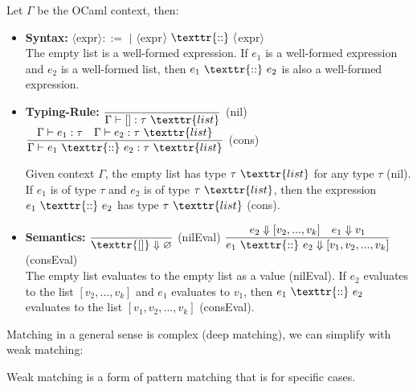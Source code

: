 \begin{Def}

    Let $\Gamma$ be the OCaml context, then:
    \begin{itemize}
        \item \textbf{Syntax:} \LARGE 
        $\langle$expr$\rangle::=$ \texttr{[]} $\mid$ $\langle$expr$\rangle\ \texttr{::}\ \langle$expr$\rangle$ \normalsize\\
        
        \vspace{-.5em}
        \noindent
        The empty list \texttr{[]} is a well-formed expression. If $e_1$ is a well-formed expression and $e_2$ is a well-formed list, then $e_1\ \texttr{::}\ e_2$ is also a well-formed expression.

        \item \textbf{Typing-Rule:} \large \quad 
            $\dfrac{}{\Gamma\vdash []:\tau\ \texttr{list}}$ (nil)
            \quad
             $\dfrac{\Gamma\vdash e_1:\tau \quad \Gamma\vdash e_2:\tau\ \texttr{list}}{\Gamma\vdash e_1\ \texttr{::}\ e_2:\tau\ \texttr{list}}$ (cons) 
      

        \normalsize
        \noindent
        Given context $\Gamma$, the empty list \texttr{[]} has type $\tau\ \texttr{list}$ for any type $\tau$ (nil).
        If $e_1$ is of type $\tau$ and $e_2$ is of type $\tau\ \texttr{list}$, then the expression $e_1\ \texttr{::}\ e_2$ has type $\tau\ \texttr{list}$ (cons).

        \item \textbf{Semantics:} \large \quad
        $\dfrac{}{\texttr{[]} \Downarrow \varnothing}$ (nilEval)
        \quad $\dfrac{e_2 \Downarrow [v_2, ..., v_k] \quad e_1 \Downarrow v_1}{e_1\ \texttr{::}\ e_2 \Downarrow [v_1, v_2, ..., v_k]}$ (consEval) \normalsize\\
        
        \noindent
        The empty list \texttr{[]} evaluates to the empty list as a value (nilEval).
        If $e_2$ evaluates to the list $[v_2, ..., v_k]$ and $e_1$ evaluates to $v_1$, then $e_1\ \texttr{::}\ e_2$ evaluates to the list $[v_1, v_2, ..., v_k]$ (consEval).
    \end{itemize}
\end{Def}

\newpage

\noindent
Matching in a general sense is complex (deep matching), we can simplify with weak matching:

\begin{Def}

    Weak matching is a form of pattern matching that is for specific cases.
\end{Def}

